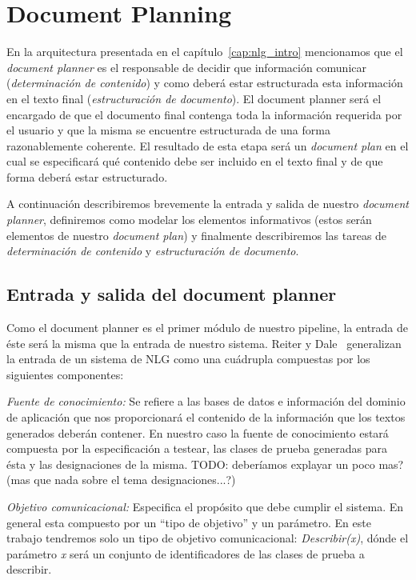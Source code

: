 \chapter{Document Planning}
\label{cap:document_planning}

En la arquitectura presentada en el capítulo~\ref{cap:nlg_intro} mencionamos que el \emph{document planner} es el responsable de decidir que información comunicar (\emph{determinación de contenido}) y como deberá estar estructurada esta información en el texto final (\emph{estructuración de documento}). El document planner será el encargado de que el documento final contenga toda la información requerida por el usuario y que la misma se encuentre estructurada de una forma razonablemente coherente. El resultado de esta etapa será un \emph{document plan} en el cual se especificará qué contenido debe ser incluido en el texto final y de que forma deberá estar estructurado.


A continuación describiremos brevemente la entrada y salida de nuestro \emph{document planner}, definiremos como modelar los elementos informativos (estos serán elementos de nuestro \emph{document plan}) y finalmente describiremos las tareas de \emph{determinación de contenido} y \emph{estructuración de documento}.

\section{Entrada y salida del document planner}
Como el document planner es el primer módulo de nuestro pipeline, la entrada de éste será la misma que la entrada de nuestro sistema. Reiter y Dale~\cite{reiter_dale} generalizan la entrada de un sistema de NLG  como una cuádrupla compuestas por los siguientes componentes:

\bigskip
\noindent
\emph{Fuente de conocimiento:} Se refiere a las bases de datos e información del dominio de aplicación que nos proporcionará el contenido de la información que los textos generados deberán contener.
En nuestro caso la fuente de conocimiento estará compuesta por la especificación a testear, las clases de prueba generadas para ésta y las designaciones de la misma. TODO: deberíamos explayar un poco mas? (mas que nada sobre el tema designaciones...?)

\bigskip
\noindent
\emph{Objetivo comunicacional:} Especifica el propósito que debe cumplir el sistema. En general esta compuesto por un ``tipo de objetivo'' y un parámetro.
En este trabajo tendremos solo un tipo de objetivo comunicacional: \emph{Describir(x)}, dónde el parámetro \emph{x} será un conjunto de identificadores de las clases de prueba a describir.

